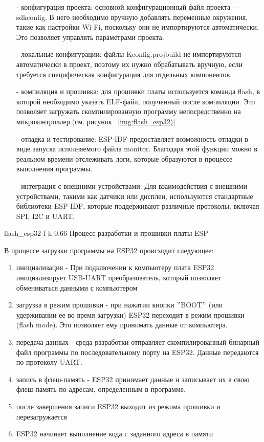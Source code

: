 \documentclass{bmstu}
\begin{document}
    \begin{itemize}
        \item[-] конфигурация проекта: основной конфигурационный файл проекта — sdkconfig.
        В него необходимо вручную добавлять переменные окружения, такие как настройки Wi-Fi, поскольку они не импортируются автоматически.
        Это позволяет управлять параметрами проекта.
        \item[-] локальные конфигурации: файлы Kconfig.projbuild не импортируются автоматически в проект,
        поэтому их нужно обрабатывать вручную, если требуется специфическая конфигурация для отдельных компонентов.
        \item[-] компиляция и прошивка: для прошивки платы используется команда flash, в которой необходимо указать ELF-файл,
        полученный после компиляции.
        Это позволяет загружать скомпилированную программу непосредственно на микроконтроллер.(см. рисунок ~\ref{img:flash_esp32)}
        \item[-] отладка и тестирование: ESP-IDF предоставляет возможность отладки в виде запуска
        исполняемого файла monitor.
        Благодаря этой функции можно в реальном времени отслеживать логи, которые образуются
        в процессе выполнения программы.
        \item[-] интеграция с внешними устройствами: Для взаимодействия с внешними устройствами, такими как датчики или
        дисплеи, используются стандартные библиотеки ESP-IDF, которые поддерживают различные протоколы, включая SPI, I2C и UART.
    \end{itemize}

    {flash_esp32} %
    {f} %
    {h} %
    {0.66\textwidth} %
    {Процесс разработки и прошивки платы ESP} %

   В процессе загрузки программы на ESP32 происходит следующее:
    \begin{enumerate}
        \item инициализация - При подключении к компьютеру плата ESP32 инициализирует USB-UART преобразователь,
        который позволяет обмениваться данными с компьютером
        \item загрузка в режим прошивки - при нажатии кнопки \("\)BOOT\("\) (или удерживании ее во время загрузки)
        ESP32 переходит в режим прошивки (flash mode).
        Это позволяет ему принимать данные от компьютера.
        \item передача данных - среда разработки отправляет скомпилированный бинарный файл программы по
        последовательному порту на ESP32.
        Данные передаются по протоколу UART.
        \item запись в флеш-память - ESP32 принимает данные и записывает их в свою флеш-память по адресам, определенным в программе.
        \item после завершения записи ESP32 выходит из режима прошивки и перезагружается
        \item ESP32 начинает выполнение кода с заданного адреса в памяти
    \end{enumerate}
\end{document}

